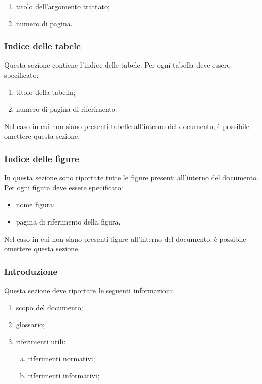 \documentclass[../NormeProgetto.tex]{subfiles}
\begin{document}
		\begin{enumerate}
		\item titolo dell'argomento trattato;
		\item numero di pagina.
		\end{enumerate}

		\subsubsection{Indice delle tabele}
		Questa sezione contiene l'indice delle tabele. Per ogni tabella deve essere specificato:

		\begin{enumerate}
		\item titolo della tabella;
		\item numero di pagina di riferimento.
		\end{enumerate}

		Nel caso in cui non siano presenti tabelle all'interno del documento, è possibile omettere questa sezione.

		\subsubsection{Indice delle figure}
		In questa sezione sono riportate tutte le figure presenti all'interno del documento. Per ogni figura deve essere specificato:
		\begin{itemize}
		\item nome figura;
		\item pagina di riferimento della figura.
		\end{itemize}
		Nel caso in cui non siano presenti figure all'interno del documento, è possibile omettere questa sezione.

		\subsubsection{Introduzione}
		Questa sezione deve riportare le seguenti informazioni:
		\begin{enumerate}
		\item scopo del documento;
		\item glossario;
		\item riferimenti utili:
			\begin{enumerate}[a.]
			\item riferimenti normativi;
			\item riferimenti informativi;
			\end{enumerate}
		\end{enumerate}
\end{document}
